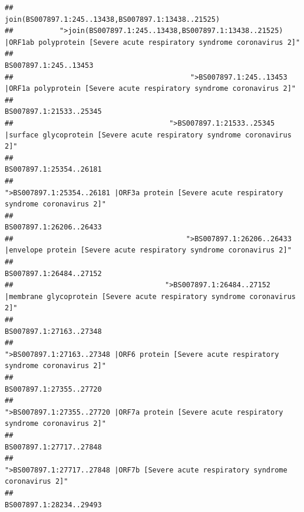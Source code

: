 \documentclass[
]{article}
\begin{document}
\begin{verbatim}
##                                                                                    join(BS007897.1:245..13438,BS007897.1:13438..21525) 
##           ">join(BS007897.1:245..13438,BS007897.1:13438..21525) |ORF1ab polyprotein [Severe acute respiratory syndrome coronavirus 2]" 
##                                                                                                                  BS007897.1:245..13453 
##                                          ">BS007897.1:245..13453 |ORF1a polyprotein [Severe acute respiratory syndrome coronavirus 2]" 
##                                                                                                                BS007897.1:21533..25345 
##                                     ">BS007897.1:21533..25345 |surface glycoprotein [Severe acute respiratory syndrome coronavirus 2]" 
##                                                                                                                BS007897.1:25354..26181 
##                                            ">BS007897.1:25354..26181 |ORF3a protein [Severe acute respiratory syndrome coronavirus 2]" 
##                                                                                                                BS007897.1:26206..26433 
##                                         ">BS007897.1:26206..26433 |envelope protein [Severe acute respiratory syndrome coronavirus 2]" 
##                                                                                                                BS007897.1:26484..27152 
##                                    ">BS007897.1:26484..27152 |membrane glycoprotein [Severe acute respiratory syndrome coronavirus 2]" 
##                                                                                                                BS007897.1:27163..27348 
##                                             ">BS007897.1:27163..27348 |ORF6 protein [Severe acute respiratory syndrome coronavirus 2]" 
##                                                                                                                BS007897.1:27355..27720 
##                                            ">BS007897.1:27355..27720 |ORF7a protein [Severe acute respiratory syndrome coronavirus 2]" 
##                                                                                                                BS007897.1:27717..27848 
##                                                    ">BS007897.1:27717..27848 |ORF7b [Severe acute respiratory syndrome coronavirus 2]" 
##                                                                                                                BS007897.1:28234..29493 

\end{verbatim}
\end{document}
